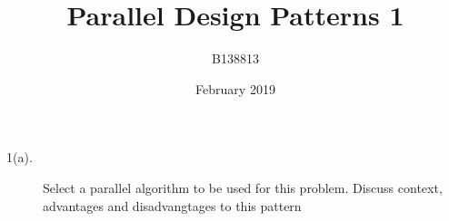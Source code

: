 \documentclass{article}
\title{Parallel Design Patterns 1}
\author{B138813}
\date{February 2019}
\begin{document}
\maketitle
\begin{description}
    \item [1(a).] Select a parallel algorithm to be used for this problem. Discuss context, advantages and disadvangtages to this pattern
\end{description}
\end{document}
